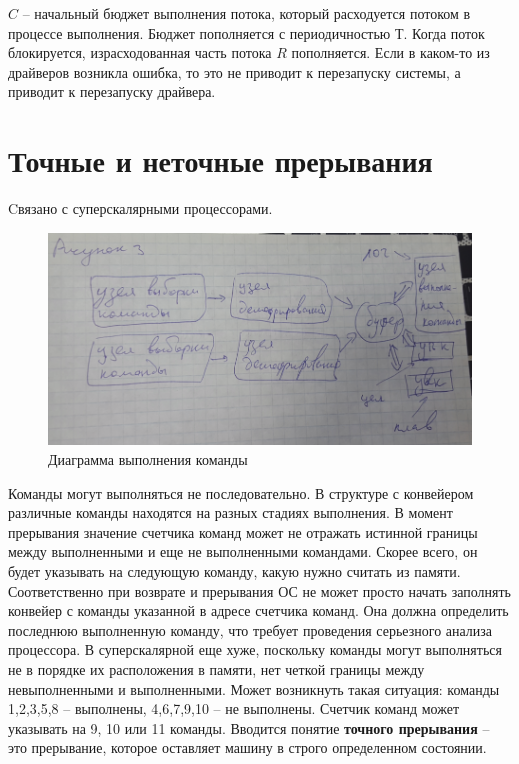 $C$ – начальный бюджет выполнения потока, который расходуется потоком в процессе выполнения. Бюджет пополняется с периодичностью $Т$. Когда поток блокируется, израсходованная часть потока $R$ пополняется. 
Если в каком-то из драйверов возникла ошибка, то это не приводит к перезапуску системы, а приводит к перезапуску драйвера. 

\chapter{Точные и неточные прерывания}
Cвязано с суперскалярными процессорами.

\begin{figure}[H]
    \centering
    \includegraphics[width=\textwidth]{pic/3.png}
    \caption{Диаграмма выполнения команды}
\end{figure}

Команды могут выполняться не последовательно. В структуре с конвейером различные команды находятся на разных стадиях выполнения. В момент прерывания значение счетчика команд может не отражать истинной границы между выполненными и еще не выполненными командами. Скорее всего, он будет указывать на следующую команду, какую нужно считать из памяти. Соответственно при возврате и прерывания ОС не может просто начать заполнять конвейер с команды указанной в адресе счетчика команд.  Она должна определить последнюю выполненную команду, что требует проведения серьезного анализа процессора. В суперскалярной еще хуже, поскольку команды могут выполняться не в порядке их расположения в памяти, нет четкой границы между невыполненными и выполненными. 
Может возникнуть такая ситуация: команды 1,2,3,5,8 – выполнены, 4,6,7,9,10 – не выполнены. Счетчик команд может указывать на 9, 10 или 11 команды. Вводится понятие \textbf{точного прерывания} – это прерывание, которое оставляет машину в строго определенном состоянии. 

